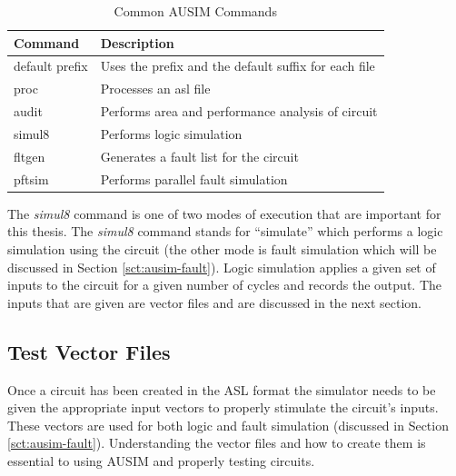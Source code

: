\documentclass[12pt]{report}
\begin{document}
\begin{table}
	\caption{Common AUSIM Commands\cite{ausim}}
	\begin{center}
		\begin{tabular}{|l|l|}
		\hline
		Command & Description \\ \hline
		default prefix & Uses the prefix and the default suffix for each file \\ \hline
		proc & Processes an asl file \\ \hline
		audit & Performs area and performance analysis of circuit \\ \hline
		simul8 & Performs logic simulation \\ \hline
		fltgen & Generates a fault list for the circuit \\ \hline
		pftsim & Performs parallel fault simulation \\ \hline
		\end{tabular}
	\end{center}
	\label{tbl:ausim_commands}
\end{table}
The \textit{simul8} command is one of two modes of execution that are important for this thesis.  The \textit{simul8} command stands for ``simulate'' which performs a logic simulation using the circuit (the other mode is fault simulation which will be discussed in Section \ref{sct:ausim-fault}).  Logic simulation applies a given set of inputs to the circuit for a given number of cycles and records the output.  The inputs that are given are vector files and are discussed in the next section.

\subsection{Test Vector Files}
Once a circuit has been created in the ASL format the simulator needs to be given the appropriate input vectors to properly stimulate the circuit's inputs. These vectors are used for both logic and fault simulation (discussed in Section \ref{sct:ausim-fault}).  Understanding the vector files and how to create them is essential to using AUSIM and properly testing circuits.
\end{document}
